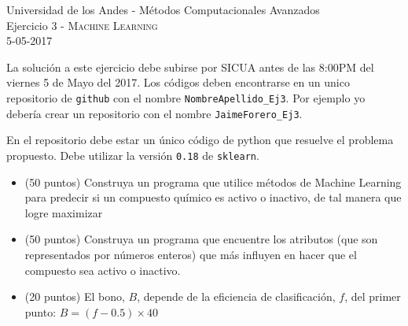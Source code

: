 \documentclass[11pt,letterpaper]{exam}
\begin{document}
\begin{center}
{\Large Universidad de los Andes - M\'etodos Computacionales Avanzados} \\
Ejercicio 3 - \textsc{Machine Learning}\\
5-05-2017\\
\end{center}



\vspace{0.3cm}


\noindent
La solución a este ejercicio debe subirse por SICUA antes de las 8:00PM
del viernes 5 de Mayo del 2017. 
Los c\'odigos deben encontrarse en un unico repositorio de \verb'github'
con el nombre \verb"NombreApellido_Ej3". Por ejemplo yo deber\'ia
crear un repositorio con el nombre
\verb"JaimeForero_Ej3". 

\noindent

En el repositorio debe estar un \'unico c\'odigo de python que
resuelve el problema propuesto. Debe utilizar la versi\'on \verb"0.18" de \verb"sklearn".

\vspace{0.3cm}

\begin{questions}
\begin{itemize}
Utilizando los siguientes conjuntos de datos \url{http://archive.ics.uci.edu/ml/datasets/Dorothea}
\item (50 puntos) Construya un programa que utilice m\'etodos de Machine Learning para predecir si un compuesto qu\'imico es activo o inactivo, de tal manera que logre maximizar 
\item (50 puntos) Construya un programa que encuentre los atributos (que son representados por n\'umeros enteros) que m\'as influyen en hacer que el compuesto sea activo o inactivo.
\item (20 puntos) El bono, $B$, depende de la eficiencia de clasificaci\'on, $f$, del primer punto: $B = (f-0.5)\times 40$
\end{itemize}
\end{questions}
\end{document}
